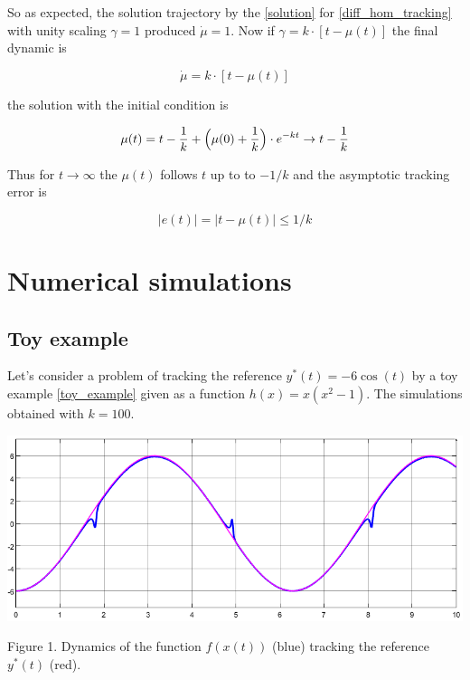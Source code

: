 \documentclass[11pt,american]{article}
\begin{document}
So as expected, the solution trajectory by the \eqref{solution} for \eqref{diff_hom_tracking} with unity scaling $\gamma = 1$ produced $\dot \mu = 1$.
Now if $\gamma = k \cdot [t - \mu(t)]$ the final dynamic is

\begin{equation}
\dot \mu = k \cdot [t - \mu(t)]
\end{equation}

the solution with the initial condition is

\begin{equation}
\mu(t) = t - \frac{1}{k} + \Bigl(\mu(0)+\frac{1}{k}\Bigr) \cdot e^{-kt} \to t - \frac{1}{k}
\end{equation}

Thus for $t \to \infty$ the $\mu(t)$ follows $t$ up to to $-1/k$ and the asymptotic tracking error is

\begin{equation}
|e(t)| = |t - \mu(t)| \le 1/k
\end{equation}


\section{Numerical simulations}

\subsection{Toy example}

Let's consider a problem of tracking the reference $y^*(t) = -6 \cos(t)$ by a toy example \eqref{toy_example} given as a function $h(x) = x (x^2 - 1)$.
The simulations obtained with $k = 100$.

\begin{center}
\ifpdf %
  \includegraphics[width=1\textwidth]{toy_y.png}
\fi

Figure 1. Dynamics of the function $f(x(t))$ (blue) tracking the reference $y^*(t)$ (red).
\end{center}
\end{document}
